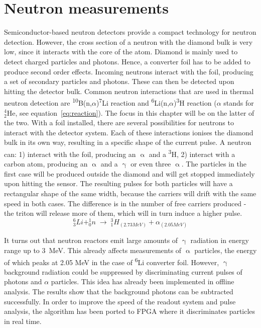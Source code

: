 \documentclass[12pt]{mytustyle}  %
\begin{document}
\clearpage
\section{Neutron measurements}
\label{sec:nm}
Semiconductor-based neutron detectors provide a compact technology for neutron detection. However, the cross section of a neutron with the diamond bulk is very low, since it interacts with the core of the atom. Diamond is mainly used to detect charged particles and photons. Hence, a converter foil has to be added to produce second order effects. Incoming neutrons interact with the foil, producing a set of secondary particles and photons. These can then be detected upon hitting the detector bulk. Common neutron interactions that are used in thermal neutron detection are \textsuperscript{10}B(n,$\alpha$)\textsuperscript{7}Li reaction and \textsuperscript{6}Li(n,$\alpha$)\textsuperscript{3}H reaction ($\alpha$ stands for $^4_2$He, see equation~\ref{eq:reaction}). The focus in this chapter will be on the latter of the two. With a foil installed, there are several possibilities for neutrons to interact with the detector system. Each of these interactions ionises the diamond bulk in its own way, resulting in a specific shape of the current pulse. A neutron can: 1) interact with the foil, producing an $\upalpha$ and a \textsuperscript{3}H, 2) interact with a carbon atom, producing an $\upalpha$ and a $\upgamma$ or even three $\upalpha$. The particles in the first case will be produced outside the diamond and will get stopped immediately upon hitting the sensor. The resulting pulses for both particles will have a rectangular shape of the same width, because the carriers will drift with the same speed in both cases. The difference is in the number of free carriers produced - the triton will release more of them, which will in turn induce a higher pulse. 
\begin{equation}
\label{eq:reaction}
   ^6_3Li   +   ^1_0n \;\rightarrow\; ^3_1H_{(2.73 MeV)} + \alpha_{(2.05 MeV)}
\end{equation}

It turns out that neutron reactors emit large amounts of $\upgamma$ radiation in energy range up to 3~MeV. This already affects measurements of $\upalpha$ particles, the energy of which peaks at 2.05 MeV in the case of \textsuperscript{6}Li converter foil. However, $\upgamma$ background radiation could be suppressed by discriminating current pulses of photons and $\alpha$ particles. This idea has already been implemented in offline analysis. The results show that the background photons can be subtracted successfully. In order to improve the speed of the readout system and pulse analysis, the algorithm has been ported to FPGA where it discriminates particles in real time. 
\end{document}
